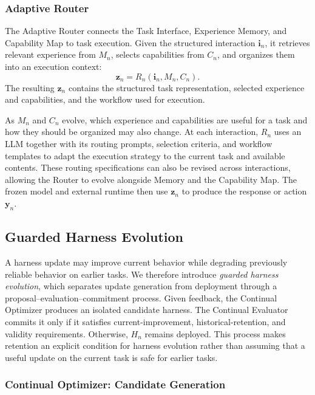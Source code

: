 \documentclass{article}
\begin{document}
\subsubsection{Adaptive Router}
\label{sec:adaptive_router}

The Adaptive Router connects the Task Interface, Experience Memory, and
Capability Map to task execution. Given the structured interaction
$\mathbf{i}_n$, it retrieves relevant experience from $M_n$, selects
capabilities from $C_n$, and organizes them into an execution context:
\begin{equation}
\label{eq:adaptive_router_context}
\mathbf{z}_n
=
R_n
\left(
\mathbf{i}_n,
M_n,
C_n
\right).
\end{equation}
The resulting $\mathbf{z}_n$ contains the structured task representation,
selected experience and capabilities, and the workflow used for execution.

As $M_n$ and $C_n$ evolve, which experience and capabilities are useful for a
task and how they should be organized may also change. At each interaction,
$R_n$ uses an LLM together with its routing prompts, selection criteria, and
workflow templates to adapt the execution strategy to the current task and
available contents. These routing specifications can also be revised across
interactions, allowing the Router to evolve alongside Memory and the Capability
Map. The frozen model and external runtime then use $\mathbf{z}_n$ to produce
the response or action $\mathbf{y}_n$.

\subsection{Guarded Harness Evolution}
\label{sec:guarded_evolution}

A harness update may improve current behavior while degrading previously
reliable behavior on earlier tasks. We therefore introduce \emph{guarded
harness evolution}, which separates update generation from deployment through
a proposal--evaluation--commitment process. Given feedback, the Continual Optimizer
produces an isolated candidate harness. The Continual Evaluator commits it only if it satisfies current-improvement, historical-retention, and validity requirements. Otherwise, $H_n$ remains deployed. This process makes retention an explicit condition for harness evolution rather than assuming that a useful update on the current task is safe for earlier tasks.

\subsubsection{Continual Optimizer: Candidate Generation}
\label{sec:continual_optimizer}
\end{document}
